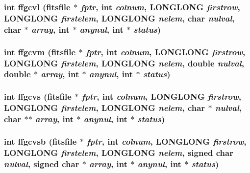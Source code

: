 \subsubsection{\setlength{\rightskip}{0pt plus 5cm}int ffgcvl (\bf{fitsfile} $\ast$ {\em fptr}, int {\em colnum}, \bf{LONGLONG} {\em firstrow}, \bf{LONGLONG} {\em firstelem}, \bf{LONGLONG} {\em nelem}, char {\em nulval}, char $\ast$ {\em array}, int $\ast$ {\em anynul}, int $\ast$ {\em status})}\label{fitsio_8h_67b03244f744a6fe2848383342dd64ba}


\subsubsection{\setlength{\rightskip}{0pt plus 5cm}int ffgcvm (\bf{fitsfile} $\ast$ {\em fptr}, int {\em colnum}, \bf{LONGLONG} {\em firstrow}, \bf{LONGLONG} {\em firstelem}, \bf{LONGLONG} {\em nelem}, double {\em nulval}, double $\ast$ {\em array}, int $\ast$ {\em anynul}, int $\ast$ {\em status})}\label{fitsio_8h_e3bcf54a2fef936ae5506ffc0f88b2d0}


\subsubsection{\setlength{\rightskip}{0pt plus 5cm}int ffgcvs (\bf{fitsfile} $\ast$ {\em fptr}, int {\em colnum}, \bf{LONGLONG} {\em firstrow}, \bf{LONGLONG} {\em firstelem}, \bf{LONGLONG} {\em nelem}, char $\ast$ {\em nulval}, char $\ast$$\ast$ {\em array}, int $\ast$ {\em anynul}, int $\ast$ {\em status})}\label{fitsio_8h_415d6eb0370f3565b6d94f3ddd5be1d7}


\subsubsection{\setlength{\rightskip}{0pt plus 5cm}int ffgcvsb (\bf{fitsfile} $\ast$ {\em fptr}, int {\em colnum}, \bf{LONGLONG} {\em firstrow}, \bf{LONGLONG} {\em firstelem}, \bf{LONGLONG} {\em nelem}, signed char {\em nulval}, signed char $\ast$ {\em array}, int $\ast$ {\em anynul}, int $\ast$ {\em status})}\label{fitsio_8h_06cbefc9f11f58661a66f4ed52b05d11}


